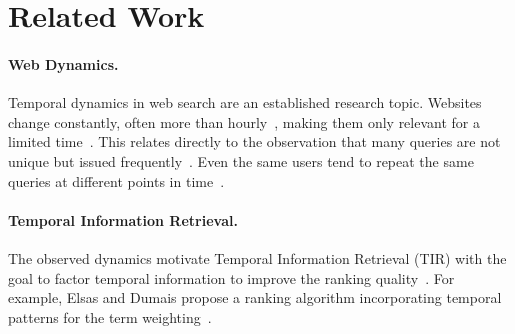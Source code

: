 \section{Related Work}
\label{sec:related-work}

\paragraph{Web Dynamics.} Temporal dynamics in web search are an established research topic. Websites change constantly, often more than hourly~\cite{DBLP:conf/wsdm/AdarTDE09},
making them only relevant for a limited time~\cite{DBLP:conf/sigir/TikhonovBBOKG13}. This relates directly to the observation that many queries are not unique but issued frequently~\cite{DBLP:conf/sigir/Dumais14,DBLP:journals/sigir/SilversteinHMM99}. Even the same users tend to repeat the same queries at different points in time~\cite{DBLP:conf/wsdm/TylerT10}.

\paragraph{Temporal Information Retrieval.} The observed dynamics motivate Temporal Information Retrieval (TIR) with the goal to factor temporal information to improve the ranking quality~\cite{DBLP:journals/ftir/KanhabuaBN15,DBLP:journals/csur/CamposDJJ14}. For example, Elsas and Dumais propose a ranking algorithm incorporating temporal patterns for the term weighting~\cite{DBLP:conf/wsdm/ElsasD10}.


